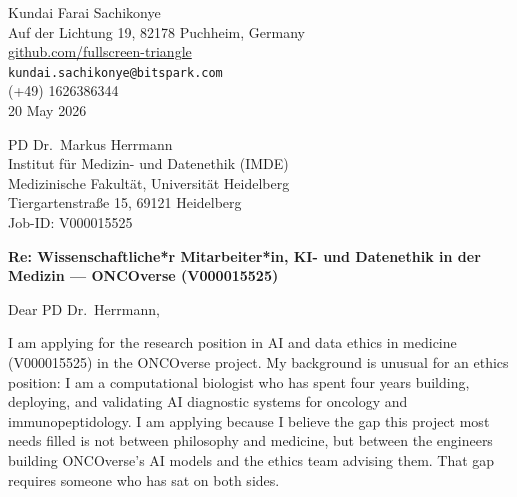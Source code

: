 \documentclass[12pt,a4paper]{article}
\begin{document}
\begin{flushright}
Kundai Farai Sachikonye \\
Auf der Lichtung 19, 82178 Puchheim, Germany \\
\href{https://github.com/fullscreen-triangle}{github.com/fullscreen-triangle} \\
\texttt{kundai.sachikonye@bitspark.com} \\
(+49) 1626386344 \\[6pt]
20 May 2026
\end{flushright}

\vspace{1em}

PD Dr.\ Markus Herrmann \\
Institut für Medizin- und Datenethik (IMDE) \\
Medizinische Fakultät, Universität Heidelberg \\
Tiergartenstraße 15, 69121 Heidelberg \\
Job-ID: V000015525

\vspace{1.5em}

\textbf{Re: Wissenschaftliche*r Mitarbeiter*in, KI- und Datenethik in der Medizin ---
ONCOverse (V000015525)}

\vspace{1em}

Dear PD Dr.\ Herrmann,

I am applying for the research position in AI and data ethics in medicine (V000015525)
in the ONCOverse project.
My background is unusual for an ethics position: I am a computational biologist who
has spent four years building, deploying, and validating AI diagnostic systems for
oncology and immunopeptidology.
I am applying because I believe the gap this project most needs filled is not
between philosophy and medicine, but between the engineers building ONCOverse's
AI models and the ethics team advising them.
That gap requires someone who has sat on both sides.
\end{document}
